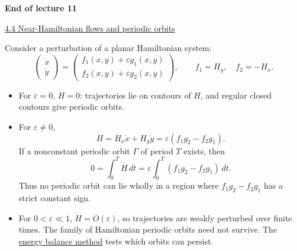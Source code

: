 \documentclass[11pt,a4paper]{article}
\begin{document}
\begin{center}
\textbf{End of lecture 11}
\end{center}

\newpage
\noindent\underline{4.4 Near-Hamiltonian flows and periodic orbits}

\medskip
\noindent Consider a perturbation of a planar Hamiltonian system:
\[
\begin{pmatrix}\dot x\\\dot y\end{pmatrix}
=\begin{pmatrix}f_1(x,y)+\varepsilon g_1(x,y)\\
f_2(x,y)+\varepsilon g_2(x,y)\end{pmatrix},
\qquad f_1=H_y,\quad f_2=-H_x.
\]
\begin{itemize}
\item For $\varepsilon=0$, $\dot H=0$: trajectories lie on contours of
$H$, and regular closed contours give periodic orbits.
\item For $\varepsilon\ne0$,
\[
\dot H=H_x\dot x+H_y\dot y
=\varepsilon(f_1g_2-f_2g_1).
\]
If a nonconstant periodic orbit $\Gamma$ of period $T$ exists, then
\[
0=\int_0^T\dot H\,dt
=\varepsilon\int_0^T(f_1g_2-f_2g_1)\,dt.
\]
Thus no periodic orbit can lie wholly in a region where
$f_1g_2-f_2g_1$ has a strict constant sign.
\item For $0<\varepsilon\ll1$, $\dot H=O(\varepsilon)$, so trajectories
are weakly perturbed over finite times. The family of Hamiltonian periodic
orbits need not survive. The \underline{energy balance method} tests which
orbits can persist.
\end{itemize}
\end{document}
